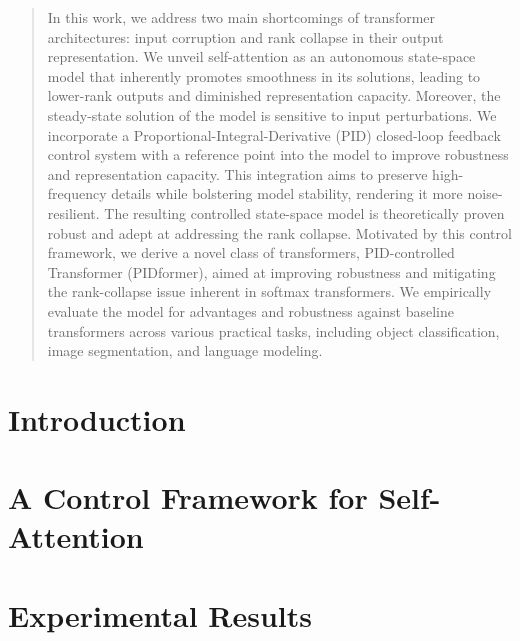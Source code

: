 \documentclass{article}
\begin{document}
\printAffiliationsAndNotice{\icmlEqualContribution} %

\begin{abstract}
In this work, we address two main shortcomings of transformer architectures: input corruption and rank collapse in their output representation. We unveil self-attention as an autonomous state-space model that inherently promotes smoothness in its solutions, leading to lower-rank outputs and diminished representation capacity. Moreover, the steady-state solution of the model is sensitive to input perturbations. We incorporate a Proportional-Integral-Derivative (PID) closed-loop feedback control system with a reference point into the model to improve robustness and representation capacity. This integration aims to preserve high-frequency details while bolstering model stability, rendering it more noise-resilient. The resulting controlled state-space model is theoretically proven robust and adept at addressing the rank collapse. Motivated by this control framework, we derive a novel class of transformers, PID-controlled Transformer (PIDformer), aimed at improving robustness and mitigating the rank-collapse issue inherent in softmax transformers. We empirically evaluate the model for advantages and robustness against baseline transformers across various practical tasks, including object classification, image segmentation, and language modeling.
\end{abstract}

\vspace{-8mm}
\section{Introduction}
\label{sec:intro}

\vspace{-3mm}
\section{A Control Framework for Self-Attention}
\label{sec:method}

\vspace{-3mm}
\section{Experimental Results}
\label{sec:experiment}

% 
\vspace{-3mm}
\end{document}
